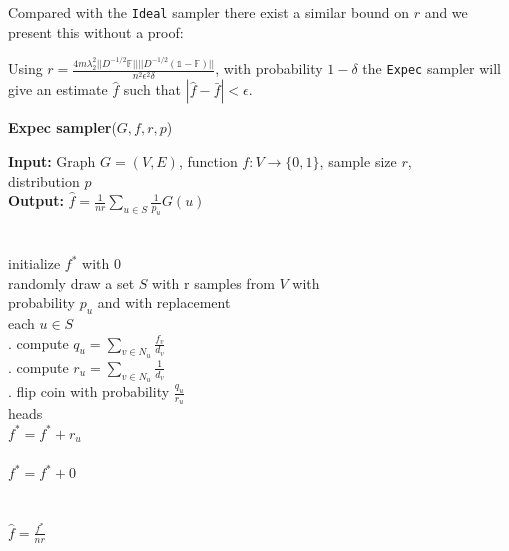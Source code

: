 Compared with the \texttt{Ideal} sampler there exist a similar bound on $r$ and we present this without a proof:
\begin{theorem}
Using $r = \frac{4m\lambda_2^2||D^{-1/2}\mathds{F}||||D^{-1/2}(\mathds{1}-\mathds{F})||}{n^2\epsilon^2\delta}$, with probability $1-\delta$ the \texttt{Expec} sampler will give an estimate $\hat{f}$ such that $|\hat{f}-\bar{f}|< \epsilon$.  
\end{theorem}
\begin{algorithm*}[!htb]
\caption{\small {\bf Expec sampler}($G, f, r, p$)}
\begin{code}
{\bf Input:} Graph $G=(V,E)$, function $f : V \rightarrow \{0,1\}$, sample size $r$,\\ distribution $p$ \\
{\bf Output:} $\hat{f}=\frac{1}{nr}\sum\nolimits_{u\in S}\frac{1}{p_u}G(u)$\\
\\
\uln \>\ubegin\\
\uln \>\>initialize $f^*$ with 0 \\
\uln \>\>randomly draw a set $S$ with r samples from $V$ with\\
\>   \>\>\>probability $p_u$ and with replacement\\
\uln \>\>\ufor each $u \in S$ \udo\\
\uln \>\>. compute $q_u = \sum_{v\in N_u}\frac{f_v}{d_v}$\\
\>   \>\>. compute $r_u = \sum_{v\in N_u}\frac{1}{d_v}$\\
\>   \>\>. flip coin with probability $\frac{q_u}{r_u}$\\
\uln \>\>\>\uif heads\\
\uln \>\>\>\>$f^* = f^* + r_u$ \\
\uln \>\>\>\uelse\\
\uln \>\>\>\>$f^* = f^* + 0$ \\
\uln \>\>\>\uend\\
\uln \>\>\uend\\
\uln \>\ureturn $\hat{f} = \frac{f^*}{nr}$ \\
\uln \>\uend\\ 
\end{code}
\label{algexpec}
\end{algorithm*}
